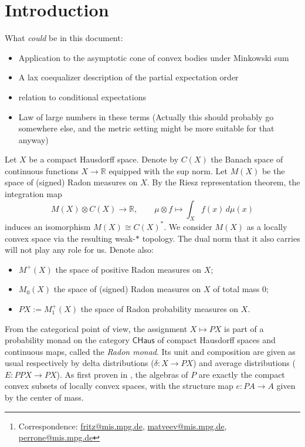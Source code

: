 \documentclass[a4paper,12pt]{scrartcl}
\title{\tit}
\author{\auth\thanks{Correspondence: \href{mailto:fritz@mis.mpg.de}{fritz@mis.mpg.de}, \href{mailto:matveev@mis.mpg.de}{matveev@mis.mpg.de}, \href{mailto:perrone@mis.mpg.de}{perrone@mis.mpg.de}}}
\affil{\small Max Planck Institute for Mathematics in the Sciences\\ Leipzig, Germany}
\date{}
\numberwithin{equation}{section}
\theoremstyle{plain}
\theoremstyle{definition}
\newcommand{\R}{\mathbb{R}}
\newcommand{\cat}[1]{{\mathsf{#1}}} %
\DeclareMathOperator{\1}{\mathbbm{1}}
\DeclareMathOperator{\2}{\mathbbm{2}}
\begin{document}
\maketitle

\begin{abstract}
This is abstract
\end{abstract}

\tableofcontents


\section{Introduction}

What \emph{could} be in this document:

\begin{itemize}
\item Application to the asymptotic cone of convex bodies under Minkowski sum
\item A lax coequalizer description of the partial expectation order
\item relation to conditional expectations
\item Law of large numbers in these terms (Actually this should probably go somewhere else, and the metric setting might be more suitable for that anyway)
\end{itemize}

Let $X$ be a compact Hausdorff space. Denote by $C(X)$ the Banach space of continuous functions $X\to\R$ equipped with the sup norm. Let $M(X)$ be the space of (signed) Radon measures on $X$. By the Riesz representation theorem, the integration map
\[
	M(X)\otimes C(X)\to\R,\qquad \mu\otimes f\mapsto \int_X f(x)\, d\mu(x)
\]
induces an isomorphism $M(X)\cong C(X)^*$. We consider $M(X)$ as a locally convex space via the resulting weak-$*$ topology. The dual norm that it also carries will not play any role for us. Denote also:
\begin{itemize}
 \item $M^+(X)$ the space of positive Radon measures on $X$;
 \item $M_0(X)$ the space of (signed) Radon measures on $X$ of total mass $0$;
 \item $PX := M_1^+(X)$ the space of Radon probability measures on $X$.
\end{itemize}

From the categorical point of view, the assignment $X\mapsto PX$ is part of a probability monad on the category $\cat{CHaus}$ of compact Hausdorff spaces and continuous maps, called the \emph{Radon monad}. Its unit and composition are given as usual respectively by delta distributions ($\delta:X\to PX$) and average distributions ($E:PPX\to PX$). As first proven in \cite{swirszcz}, the algebras of $P$ are exactly the compact convex subsets of locally convex spaces, with the structure map $e:PA\to A$ given by the center of mass.
\end{document}
